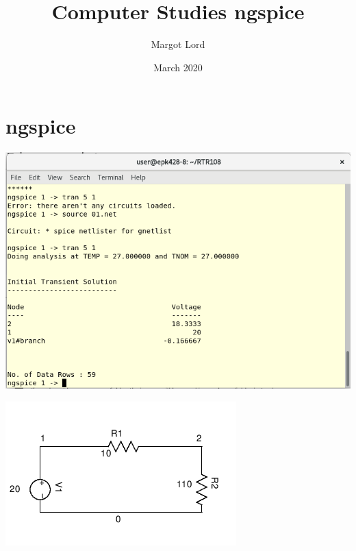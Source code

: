 \documentclass{article}
\title{Computer Studies ngspice}
\author{Margot Lord}
\date{March 2020}
\begin{document}
\maketitle

\section{ngspice}
\begin{center}
    
\includegraphics[scale=0.4]{Screen1.png}

\includegraphics[scale=0.8]{01.png}
\end{center}

\end{document}
